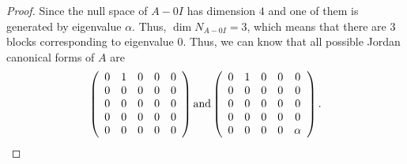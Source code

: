 \documentclass[11pt]{book}
\theoremstyle{definition}
\numberwithin{equation}{chapter}
\begin{document}
\begin{proof}
Since the null space of $A-0I$ has dimension $4$ and one of them is generated by eigenvalue $\alpha$. Thus, $\dim  N_{A-0I}=3$, which means that there are $3$ blocks corresponding to eigenvalue $0$. Thus, we can know that all possible Jordan canonical forms of $A$ are
\begin{align*}
    \left(\begin{array}
    [c]{ccccc}%
    0 & 1 & 0 & 0 & 0\\
    0 & 0 & 0 & 0 & 0\\
    0 & 0 & 0 & 0 & 0\\
    0 & 0 & 0 & 0 & 0\\
    0 & 0 & 0 & 0 & 0
    \end{array}\right) \text{and}
    \left(\begin{array}
    [c]{ccccc}%
    0 & 1 & 0 & 0 & 0\\
    0 & 0 & 0 & 0 & 0\\
    0 & 0 & 0 & 0 & 0\\
    0 & 0 & 0 & 0 & 0\\
    0 & 0 & 0 & 0 & \alpha
    \end{array}\right).
\end{align*}
\end{proof}

\medskip
\end{document}

